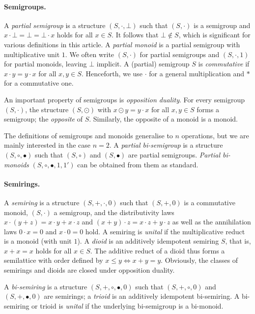 \documentclass[12pt]{article}
\theoremstyle{definition}
\begin{document}
\paragraph{Semigroups.}
A \emph{partial semigroup} is a structure $(S,\cdot,\bot)$ such that
$(S,\cdot)$ is a semigroup and $x\cdot \bot =\bot = \bot \cdot x$
holds for all $x \in S$.  It follows that $\bot \notin S$, which is
significant for various definitions in this article. A \emph{partial
  monoid} is a partial semigroup with multiplicative unit $1$. We
often write $(S,\cdot)$ for partial semigroups and $(S,\cdot, 1)$ for
partial monoids, leaving $\bot$ implicit. A (partial) semigroup $S$ is
\emph{commutative} if $x\cdot y=y\cdot x$ for all $x,y\in
S$. Henceforth, we use $\cdot$ for a general multiplication and $\ast$
for a commutative one.

An important property of semigroups is \emph{opposition duality}.  For
every semigroup $(S,\cdot)$, the structure $(S,\odot)$ with $x\odot
y=y\cdot x$ for all $x,y\in S$ forms a semigroup; the \emph{opposite}
of $S$. Similarly, the opposite of a monoid is a monoid.

The definitions of semigroups and monoids generalise to $n$
operations, but we are mainly interested in the case $n=2$. A
\emph{partial bi-semigroup} is a structure $(S,\circ,\bullet)$ such
that $(S,\circ)$ and $(S,\bullet)$ are partial semigroups. 
\emph{Partial bi-monoids} $(S,\circ,\bullet,1,1')$ can be obtained from them as
standard.

\paragraph{Semirings.}
A \emph{semiring} is a structure $(S,+,\cdot,0)$ such that $(S,+,0)$
is a commutative monoid, $(S,\cdot)$ a semigroup, and the
distributivity laws $x\cdot (y+z)=x\cdot y+x\cdot z$ and $(x+y)\cdot
z= x\cdot z+y\cdot z$ as well as the annihilation laws $0\cdot x= 0$
and $x\cdot 0=0$ hold. A semiring is \emph{unital} if the
multiplicative reduct is a monoid (with unit $1$). A \emph{dioid} is
an additively idempotent semiring $S$, that is, $x+x=x$ holds for all
$x\in S$. The additive reduct of a dioid thus forms a semilattice with
order defined by $x\le y\Leftrightarrow x+y=y$.  Obviously, the
classes of semirings and dioids are closed under opposition duality.

A \emph{bi-semiring} is a structure 
$(S,+,\circ,\bullet,0)$ such that $(S,+,\circ,0)$ and 
$(S,+,\bullet,0)$ are semirings; a \emph{trioid} is an additively 
idempotent bi-semiring. A bi-semiring or trioid is \emph{unital} if 
the underlying bi-semigroup is a bi-monoid. 
\end{document}
